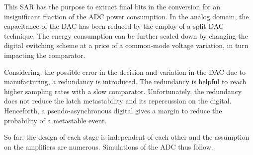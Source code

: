 This SAR has the purpose to extract final bits in the conversion for an insignificant fraction of the ADC power consumption. In the analog domain, the capacitance of the DAC has been reduced by the employ of a split-DAC technique. The energy consumption can be further scaled down by changing the digital switching scheme at a price of a common-mode voltage variation, in turn impacting the comparator.

Considering, the possible error in the decision and variation in the DAC due to manufacturing, a redundancy is introduced. The redundancy is helpful to reach higher sampling rates with a slow comparator. Unfortunately, the redundancy does not reduce the latch metastability and its repercussion on the digital. Henceforth, a pseudo-asynchronous digital gives a margin to reduce the probability of a metastable event.

So far, the design of each stage is independent of each other and the assumption on the amplifiers are numerous. Simulations of the ADC thus follow.






